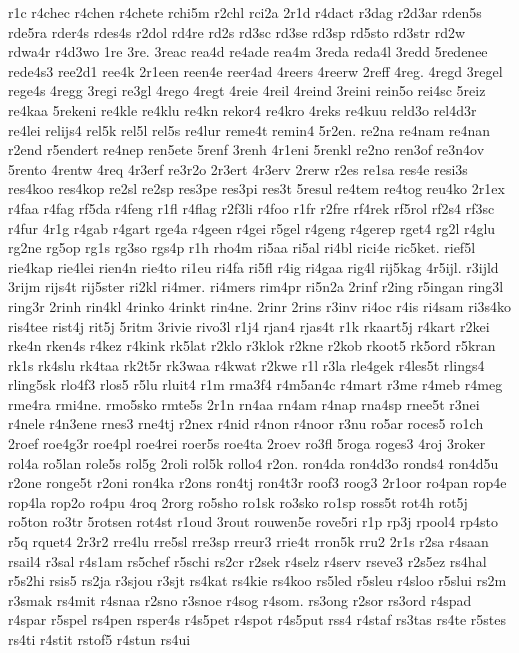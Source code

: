 {r1c
r4chec
r4chen
r4chete
rchi5m
r2chl
rci2a
2r1d
r4dact
r3dag
r2d3ar
rden5s
rde5ra
rder4s
rdes4s
r2dol
rd4re
rd2s
rd3sc
rd3se
rd3sp
rd5sto
rd3str
rd2w
rdwa4r
r4d3wo
1re
3re.
3reac
rea4d
re4ade
rea4m
3reda
reda4l
3redd
5redenee
rede4s3
ree2d1
ree4k
2r1een
reen4e
reer4ad
4reers
4reerw
2reff
4reg.
4regd
3regel
rege4s
4regg
3regi
re3gl
4rego
4regt
4reie
4reil
4reind
3reini
rein5o
rei4sc
5reiz
re4kaa
5rekeni
re4kle
re4klu
re4kn
rekor4
re4kro
4reks
re4kuu
reld3o
rel4d3r
re4lei
relijs4
rel5k
rel5l
rel5s
re4lur
reme4t
remin4
5r2en.
re2na
re4nam
re4nan
r2end
r5endert
re4nep
ren5ete
5renf
3renh
4r1eni
5renkl
re2no
ren3of
re3n4ov
5rento
4rentw
4req
4r3erf
re3r2o
2r3ert
4r3erv
2rerw
r2es
re1sa
res4e
resi3s
res4koo
res4kop
re2sl
re2sp
res3pe
res3pi
res3t
5resul
re4tem
re4tog
reu4ko
2r1ex
r4faa
r4fag
rf5da
r4feng
r1fl
r4flag
r2f3li
r4foo
r1fr
r2fre
rf4rek
rf5rol
rf2s4
rf3sc
r4fur
4r1g
r4gab
r4gart
rge4a
r4geen
r4gei
r5gel
r4geng
r4gerep
rget4
rg2l
r4glu
rg2ne
rg5op
rg1s
rg3so
rgs4p
r1h
rho4m
ri5aa
ri5al
ri4bl
rici4e
ric5ket.
rief5l
rie4kap
rie4lei
rien4n
rie4to
ri1eu
ri4fa
ri5fl
r4ig
ri4gaa
rig4l
rij5kag
4r5ijl.
r3ijld
3rijm
rijs4t
rij5ster
ri2kl
ri4mer.
ri4mers
rim4pr
ri5n2a
2rinf
r2ing
r5ingan
ring3l
ring3r
2rinh
rin4kl
4rinko
4rinkt
rin4ne.
2rinr
2rins
r3inv
ri4oc
r4is
ri4sam
ri3s4ko
ris4tee
rist4j
rit5j
5ritm
3rivie
rivo3l
r1j4
rjan4
rjas4t
r1k
rkaart5j
r4kart
r2kei
rke4n
rken4s
r4kez
r4kink
rk5lat
r2klo
r3klok
r2kne
r2kob
rkoot5
rk5ord
r5kran
rk1s
rk4slu
rk4taa
rk2t5r
rk3waa
r4kwat
r2kwe
r1l
r3la
rle4gek
r4les5t
rlings4
rling5sk
rlo4f3
rlos5
r5lu
rluit4
r1m
rma3f4
r4m5an4c
r4mart
r3me
r4meb
r4meg
rme4ra
rmi4ne.
rmo5sko
rmte5s
2r1n
rn4aa
rn4am
r4nap
rna4sp
rnee5t
r3nei
r4nele
r4n3ene
rnes3
rne4tj
r2nex
r4nid
r4non
r4noor
r3nu
ro5ar
roces5
ro1ch
2roef
roe4g3r
roe4pl
roe4rei
roer5s
roe4ta
2roev
ro3fl
5roga
roges3
4roj
3roker
rol4a
ro5lan
role5s
rol5g
2roli
rol5k
rollo4
r2on.
ron4da
ron4d3o
ronds4
ron4d5u
r2one
ronge5t
r2oni
ron4ka
r2ons
ron4tj
ron4t3r
roof3
roog3
2r1oor
ro4pan
rop4e
rop4la
rop2o
ro4pu
4roq
2rorg
ro5sho
ro1sk
ro3sko
ro1sp
ross5t
rot4h
rot5j
ro5ton
ro3tr
5rotsen
rot4st
r1oud
3rout
rouwen5e
rove5ri
r1p
rp3j
rpool4
rp4sto
r5q
rquet4
2r3r2
rre4lu
rre5sl
rre3sp
rreur3
rrie4t
rron5k
rru2
2r1s
r2sa
r4saan
rsail4
r3sal
r4s1am
rs5chef
r5schi
rs2cr
r2sek
r4selz
r4serv
rseve3
r2s5ez
rs4hal
r5s2hi
rsis5
rs2ja
r3sjou
r3sjt
rs4kat
rs4kie
rs4koo
rs5led
r5sleu
r4sloo
r5slui
rs2m
r3smak
rs4mit
r4snaa
r2sno
r3snoe
r4sog
r4som.
rs3ong
r2sor
rs3ord
r4spad
r4spar
r5spel
rs4pen
rsper4s
r4s5pet
r4spot
r4s5put
rss4
r4staf
rs3tas
rs4te
r5stes
rs4ti
r4stit
rstof5
r4stun
rs4ui
}
